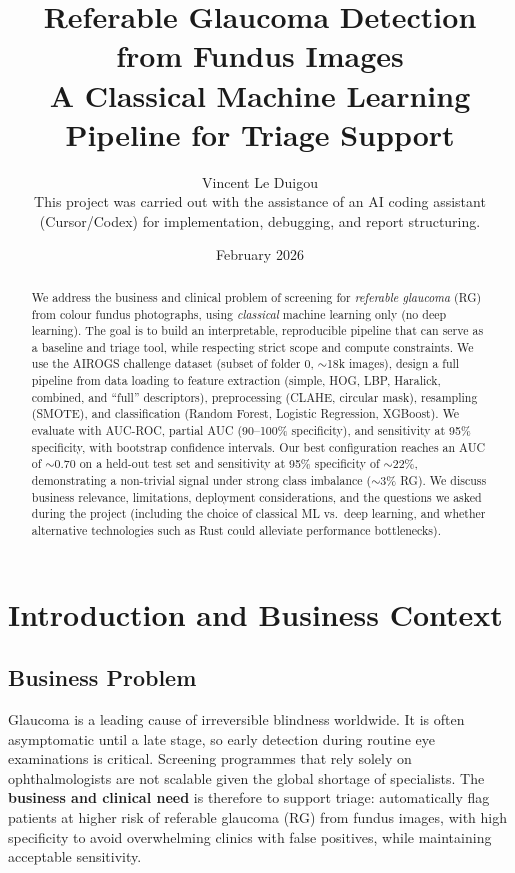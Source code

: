 \documentclass[11pt,a4paper]{article}
\title{\textbf{Referable Glaucoma Detection from Fundus Images}\\[0.4em]
\large A Classical Machine Learning Pipeline for Triage Support}
\author{Vincent Le Duigou\\[0.5em]
\small This project was carried out with the assistance of an AI coding assistant (Cursor/Codex) for implementation, debugging, and report structuring.}
\date{February 2026}
\begin{document}
\maketitle

\begin{abstract}
We address the business and clinical problem of screening for \emph{referable glaucoma} (RG) from colour fundus photographs, using \emph{classical} machine learning only (no deep learning). The goal is to build an interpretable, reproducible pipeline that can serve as a baseline and triage tool, while respecting strict scope and compute constraints. We use the AIROGS challenge dataset (subset of folder 0, $\sim$18k images), design a full pipeline from data loading to feature extraction (simple, HOG, LBP, Haralick, combined, and ``full'' descriptors), preprocessing (CLAHE, circular mask), resampling (SMOTE), and classification (Random Forest, Logistic Regression, XGBoost). We evaluate with AUC-ROC, partial AUC (90--100\% specificity), and sensitivity at 95\% specificity, with bootstrap confidence intervals. Our best configuration reaches an AUC of $\sim$0.70 on a held-out test set and sensitivity at 95\% specificity of $\sim$22\%, demonstrating a non-trivial signal under strong class imbalance ($\sim$3\% RG). We discuss business relevance, limitations, deployment considerations, and the questions we asked during the project (including the choice of classical ML vs.\ deep learning, and whether alternative technologies such as Rust could alleviate performance bottlenecks).
\end{abstract}

\tableofcontents
\newpage

\section{Introduction and Business Context}

\subsection{Business Problem}

Glaucoma is a leading cause of irreversible blindness worldwide. It is often asymptomatic until a late stage, so early detection during routine eye examinations is critical. Screening programmes that rely solely on ophthalmologists are not scalable given the global shortage of specialists. The \textbf{business and clinical need} is therefore to support triage: automatically flag patients at higher risk of referable glaucoma (RG) from fundus images, with high specificity to avoid overwhelming clinics with false positives, while maintaining acceptable sensitivity.
\end{document}
